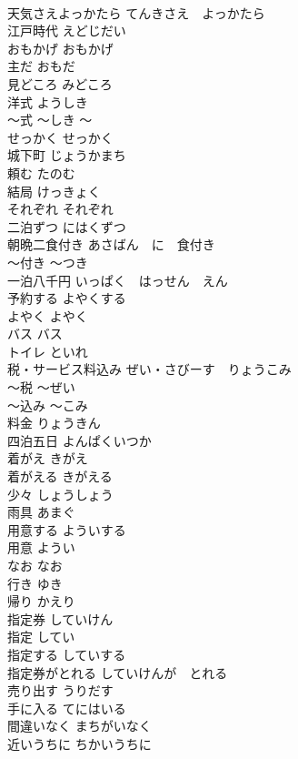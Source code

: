 \documentclass[8pt]{extreport}
\begin{document}
\begin{CJK}{UTF8}{min}
\\	天気さえよっかたら	てんきさえ　よっかたら	
\\	江戸時代	えどじだい	
\\	おもかげ	おもかげ	
\\	主だ	おもだ	
\\	見どころ	みどころ	
\\	洋式	ようしき	
\\	〜式	〜しき	〜
\\	せっかく	せっかく	
\\	城下町	じょうかまち	
\\	頼む	たのむ	
\\	結局	けっきょく	
\\	それぞれ	それぞれ	
\\	二泊ずつ	にはくずつ	
\\	朝晩二食付き	あさばん　に　食付き	
\\	〜付き	〜つき	
\\	一泊八千円	いっぱく　はっせん　えん	
\\	予約する	よやくする	
\\	よやく	よやく	
\\	バス	バス	
\\	トイレ	といれ	
\\	税・サービス料込み	ぜい・さびーす　りょうこみ	
\\	〜税	〜ぜい	
\\	〜込み	〜こみ	
\\	料金	りょうきん	
\\	四泊五日	よんぱくいつか	
\\	着がえ	きがえ	
\\	着がえる	きがえる	
\\	少々	しょうしょう	
\\	雨具	あまぐ	
\\	用意する	よういする	
\\	用意	ようい	
\\	なお	なお	
\\	行き	ゆき	
\\	帰り	かえり	
\\	指定券	していけん	
\\	指定	してい	
\\	指定する	していする	
\\	指定券がとれる	していけんが　とれる	
\\	売り出す	うりだす	
\\	手に入る	てにはいる	
\\	間違いなく	まちがいなく	
\\	近いうちに	ちかいうちに	

\end{CJK}
\end{document}
